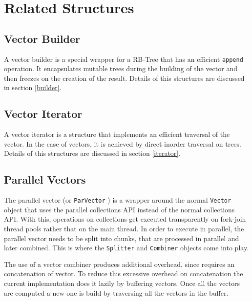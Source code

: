 
\section{Related Structures}
\label{RelatedStructures}

\subsection{Vector Builder}
A vector builder is a special wrapper for a RB-Tree that has an efficient \texttt{append} operation. It encapsulates mutable trees during the building of the vector and then freezes on the creation of the result. Details of this structures are discussed in section \ref{builder}.

\subsection{Vector Iterator}
A vector iterator is a structure that implements an efficient traversal of the vector. In the case of vectors, it is achieved by direct inorder traversal on trees. Details of this structures are discussed in section \ref{iterator}.

\subsection{Parallel Vectors}
The parallel vector (or \texttt{ParVector} \cite{scalaParVector211}) is a wrapper around the normal \texttt{Vector} object that uses the parallel collections API instead of the normal collections API. With this, operations on collections get executed transparently on fork-join thread pools rather that on the main thread. In order to execute in parallel, the parallel vector needs to be split into chunks, that are processed in parallel and later combined. This is where the \texttt{Splitter} and \texttt{Combiner} objects come into play.


The use of a vector combiner produces additional overhead, since requires an concatenation of vector. To reduce this excessive overhead on concatenation the current implementation does it lazily by buffering vectors. Once all the vectors are computed a new one is build by traversing all the vectors in the buffer. 

